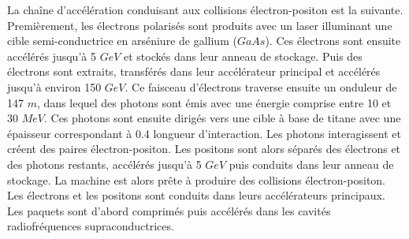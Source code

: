 La chaîne d'accélération conduisant aux collisions électron-positon est la suivante. Premièrement, les électrons polarisés sont produits avec un laser illuminant une cible semi-conductrice en arséniure de gallium ($GaAs$). Ces électrons sont ensuite accélérés jusqu'à 5 $GeV$ et stockés dans leur anneau de stockage. Puis des électrons sont extraits, transférés dans leur accélérateur principal et accélérés jusqu'à environ 150 $GeV$. Ce faisceau d'électrons traverse ensuite un onduleur de 147 $m$, dans lequel des photons sont émis avec une énergie comprise entre 10 et 30 $MeV$. Ces photons sont ensuite dirigés vers une cible à base de titane avec une épaisseur correspondant à 0.4 longueur d'interaction. Les photons interagissent et créent des paires électron-positon. Les positons sont alors séparés des électrons et des photons restants, accélérés jusqu'à 5 $GeV$ puis conduits dans leur anneau de stockage. La machine est alors prête à produire des collisions électron-positon. Les électrons et les positons sont conduits dans leurs accélérateurs principaux. Les paquets sont d'abord comprimés puis accélérés dans les cavités radiofréquences supraconductrices.

